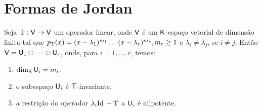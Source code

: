 \documentclass[10pt,a4paper]{book}
\begin{document}
\section{Formas de Jordan}

\begin{theorem}
	Seja $\mathrm{ T } : \mathsf{ V } \rightarrow \mathsf{ V }$ um operador linear, onde $\mathsf{ V }$ é um $\mathsf{ K }$-espaço vetorial de dimensão finita tal que $p_{\mathrm{ T }}(x) = (x - \lambda_1) ^ {m_1} \dots (x - \lambda_r) ^ {m_r}, m_r \geq 1$ e $\lambda_i \neq \lambda_j$, se $i \neq j$. Então $\mathsf{ V } = \mathsf{ U }_1 \oplus \dots \oplus \mathsf{ U }_r$, onde, para $i = 1, \dots, r$, temos:
	\begin{enumerate}
		\item $\dim_{\mathsf{ K }} \mathsf{ U }_i = m_i$.
		\item o subespaço $\mathsf{ U }_i$ é $\mathrm{ T }$-invariante.
		\item a restrição do operador $\lambda_i \mathrm{ Id }\, - \mathrm{ T }$ a $\mathsf{ U }_i$ é nilpotente.
	\end{enumerate}
\end{theorem}
\end{document}
